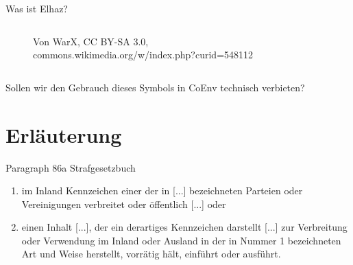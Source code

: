 \documentclass{cubeamer}
\begin{document}
\begin{frame}{Was ist Elhaz?}
    \begin{columns}
        \begin{column}{0.6\textwidth}
            \begin{figure}
                
                \caption{\tiny Von WarX, CC BY-SA 3.0, commons.wikimedia.org/w/index.php?curid=548112}
            \end{figure}
        \end{column}
        \begin{column}{0.4\textwidth}
        \end{column}
    \end{columns}
\end{frame}

\begin{frame}
    \huge Sollen wir den Gebrauch dieses Symbols in CoEnv technisch verbieten?
\end{frame}

\section{Erläuterung}

\begin{frame}{Paragraph 86a Strafgesetzbuch}
\begin{enumerate}
    \item im Inland Kennzeichen einer der in [...] bezeichneten Parteien oder Vereinigungen verbreitet oder öffentlich [...] oder
    \item einen Inhalt [...], der ein derartiges Kennzeichen darstellt [...] zur Verbreitung oder Verwendung im Inland oder Ausland in der in Nummer 1 bezeichneten Art und Weise herstellt, vorrätig hält, einführt oder ausführt.
\end{enumerate}
\end{frame}
\end{document}
